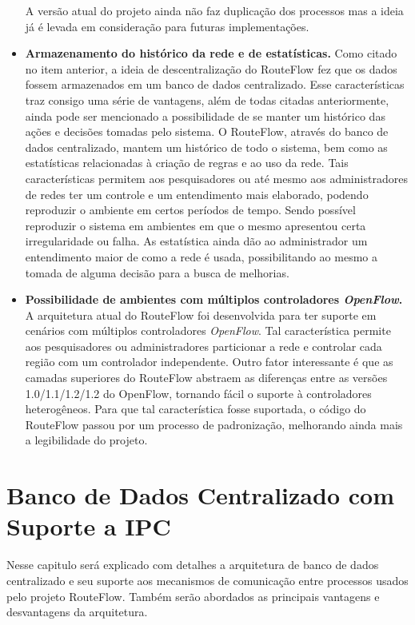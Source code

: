 \begin{itemize}
A versão atual do projeto ainda
não faz duplicação dos processos mas a ideia já é levada em
consideração para futuras implementações. 
\item \textbf{Armazenamento do histórico da rede e de estatísticas.}
Como citado no item anterior, a ideia de descentralização do RouteFlow
fez que os dados fossem armazenados em um banco de 
dados centralizado. Esse características traz consigo
uma série de vantagens, além de todas citadas anteriormente, ainda pode ser 
mencionado a possibilidade
de se manter um histórico das ações e decisões tomadas pelo
sistema. O RouteFlow, através do banco de dados centralizado, mantem 
um histórico de todo o sistema, bem como as estatísticas relacionadas 
à criação de regras e ao uso da rede. Tais características permitem
 aos pesquisadores
ou até mesmo aos administradores de redes ter um controle 
e um entendimento mais elaborado, podendo reproduzir o ambiente
em certos períodos de tempo. Sendo possível reproduzir o sistema
em ambientes em que o mesmo apresentou certa irregularidade ou
falha. 
As estatística ainda dão ao administrador um entendimento maior 
de como a rede é usada, possibilitando ao mesmo a tomada de
alguma decisão para a busca de melhorias.
\item \textbf{Possibilidade de ambientes com múltiplos controladores
\textit{OpenFlow}.} A arquitetura atual do RouteFlow foi
desenvolvida para ter suporte em cenários com múltiplos controladores
\textit{OpenFlow}. Tal característica permite aos pesquisadores
ou administradores particionar a rede e controlar cada região
com um controlador independente. Outro fator interessante é
que as camadas superiores do RouteFlow abstraem as diferenças
entre as versões 1.0/1.1/1.2/1.2 do OpenFlow, tornando fácil o
suporte à controladores heterogêneos. 
Para que tal característica fosse suportada, o código do RouteFlow
passou por um processo de padronização, melhorando ainda 
mais a legibilidade do projeto.
\end{itemize}

\section{Banco de Dados Centralizado com Suporte a IPC}

Nesse capitulo será explicado com detalhes a arquitetura de 
banco de dados centralizado e seu suporte aos mecanismos
de comunicação entre processos usados pelo projeto RouteFlow.
Também serão abordados as principais vantagens e desvantagens
da arquitetura.


